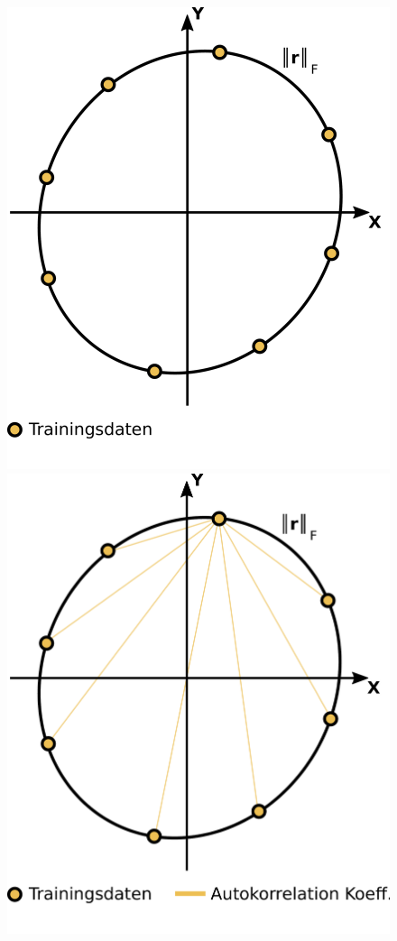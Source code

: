 \documentclass{beamer}
\begin{document}
\begin{frame}
\begin{columns}[c]
\begin{figure}
\begin{overprint}
			\includegraphics[width=\linewidth]{images/GPR_Mapping_Zero_Mean-2}
			\onslide<3>\includegraphics[width=\linewidth]{images/GPR_Mapping_Zero_Mean-3}

\end{overprint}
\end{figure}
\end{columns}
\end{frame}
\end{document}
